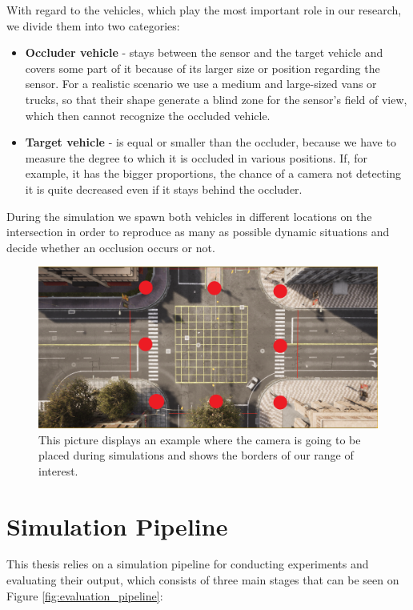 With regard to the vehicles, which play the most important role in our research, we divide them into two categories:

\begin{itemize}
    \item \textbf{Occluder vehicle} - stays between the sensor and the target vehicle and covers some part of it because of its larger size or position regarding the sensor. For a realistic scenario we use a medium and large-sized vans or trucks, so that their shape generate a blind zone for the sensor's field of view, which then cannot recognize the occluded vehicle. 
    \item \textbf{Target vehicle} - is equal or smaller than the occluder, because we have to measure the degree to which it is occluded in various positions. If, for example, it has the bigger proportions, the chance of a camera not detecting it is quite decreased even if it stays behind the occluder. 
\end{itemize}
During the simulation we spawn both vehicles in different locations on the intersection in order to reproduce as many as possible dynamic situations and decide whether an occlusion occurs or not.

\begin{figure} [h]
    \centering
    \includegraphics[width=\textwidth]{images/junction.png}
    \caption[Camera experiment positions]{This picture displays an example where the camera is going to be placed during simulations and shows the borders of our range of interest.}
    \label{fig:camera_positions}
\end{figure}

\section{Simulation Pipeline} \label{sec:sim_pipeline}

This thesis relies on a simulation pipeline for conducting experiments and evaluating their output, which consists of three main stages that can be seen on Figure \ref{fig:evaluation_pipeline}: 

